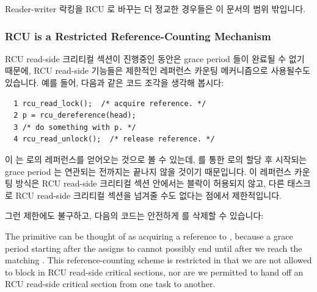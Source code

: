 Reader-writer 락킹을 RCU 로 바꾸는 더 정교한 경우들은 이 문서의 범위 밖입니다.

\subsubsection{RCU is a Restricted Reference-Counting Mechanism}
\label{sec:defer:RCU is a Restricted Reference-Counting Mechanism}

RCU read-side 크리티컬 섹션이 진행중인 동안은 grace period 들이 완료될 수 없기
때문에, RCU read-side 기능들은 제한적인 레퍼런스 카운팅 메커니즘으로 사용될수도
있습니다.
예를 들어, 다음과 같은 코드 조각을 생각해 봅시다:

\vspace{5pt}
\begin{minipage}[t]{\columnwidth}
\scriptsize
\begin{verbatim}
  1 rcu_read_lock();  /* acquire reference. */
  2 p = rcu_dereference(head);
  3 /* do something with p. */
  4 rcu_read_unlock();  /* release reference. */
\end{verbatim}
\end{minipage}
\vspace{5pt}

이  는  로의 레퍼런스를 얻어오는 것으로 볼 수
있는데,  를 통한  로의 할당 후 시작되는 grace
period 는 연관되는  전까지는 끝나지 않을
것이기 때문입니다.
이 레퍼런스 카운팅 방식은 RCU read-side 크리티컬 섹션 안에서는
블락이 허용되지 않고, 다른 태스크로 RCU read-side 크리티컬
섹션을 넘겨줄 수도 없다는 점에서 제한적입니다.

그런 제한에도 불구하고, 다음의 코드는 안전하게  를 삭제할 수 있습니다:
\iffalse

The  primitive can be thought of as
acquiring a reference to , because a grace period
starting after the  assigns to 
cannot possibly end until after we reach the matching
.
This reference-counting scheme is restricted in that
we are not allowed to block in RCU read-side critical sections,
nor are we permitted to hand off an RCU read-side critical section
from one task to another.

